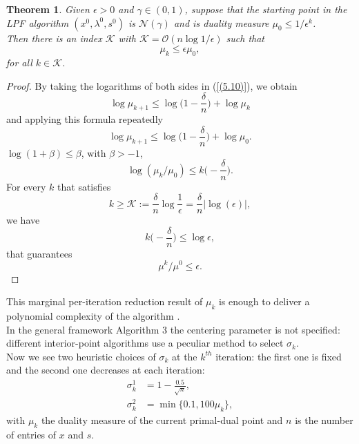 \documentclass[a4paper,10 pt,titlepage,twoside]{report}
\theoremstyle{plain}
\newtheorem{thm}{Theorem}[chapter]
\theoremstyle{definition}
\theoremstyle{remark}
\begin{document}
\begin{thm}
	Given $\epsilon>0$ and $\gamma\in(0,1)$, suppose that the starting point in the LPF algorithm $(x^{0},\lambda^{0},s^{0})$ is $\mathcal{N}(\gamma)$ and is duality measure $\mu_{0}\leq1/\epsilon^{k}$.\\ Then there is an index $\mathcal{K}$ with $\mathcal{K}=\mathcal{O}(n\log1/\epsilon)$ such that 
	\begin{equation*}\mu_{k}\leq\epsilon\mu_{0},\end{equation*} for all $k\in\mathcal{K}$.
\end{thm}
\begin{proof}
	By taking the logarithms of both sides in (\ref{(5.10)}), we obtain
	\begin{equation*}
	\log\mu_{k+1}\leq \log \bigg(1-\frac{\delta}{n}\bigg)+\log\mu_{k}\end{equation*}
	and applying this formula repeatedly
	\begin{equation*}
	\log\mu_{k+1}\leq \log \bigg(1-\frac{\delta}{n}\bigg)+\log\mu_{0}.
	\end{equation*}
	 $\log(1+\beta)\leq\beta$, with $\beta>-1$,\\
	\begin{equation*}
	\log(\mu_{k}/\mu_{0})\leq k\bigg(-\frac{\delta}{n}\bigg).
	\end{equation*}	
	For every $k$ that satisfies
	\begin{equation*}
	k\geq\mathcal{K}:= \frac{\delta}{n}\log\frac{1}{\epsilon} = \frac{\delta}{n}|\log(\epsilon)|,
	\end{equation*}
	we have 
	\begin{equation*}
	k\bigg(-\frac{\delta}{n}\bigg)\leq\log\epsilon,
	\end{equation*}	
	that guarantees
	\begin{equation*}
	\mu^{k}/\mu^{0}\leq\epsilon.
	\end{equation*}	
\end{proof}

This marginal per-iteration reduction result of $\mu_{k}$ is enough to deliver a polynomial complexity of the algorithm \cite{25y}.\\

In the general framework Algorithm 3 the centering parameter is not specified: different interior-point algorithms use a peculiar method to select $\sigma_{k}$.\\
Now we see two heuristic choices of $\sigma_{k}$ at the $k^{th}$ iteration: the first one is fixed and the second one decreases at each iteration: 
\begin{align}
\sigma^{1}_{k} &= 1 -\frac{0.5}{\sqrt{n}},\label{LPF1}\tag{4.14a}\\
\sigma^{2}_{k} &= \min\{0.1, 100\mu_{k} \},\label{LPF2}\tag{4.14b}
\end{align}
with $\mu_{k}$ the duality measure of the current primal-dual point and $n$ is the number of entries of $x$ and $s$. 
\end{document}
